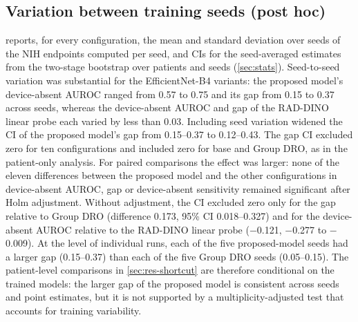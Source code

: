 \documentclass{ieeeaccess}
\begin{document}
\subsection{Variation between training seeds (post hoc)}
\label{sec:res-seeds}
 reports, for every configuration, the mean and standard deviation over seeds of the NIH endpoints computed per seed, and CIs for the seed-averaged estimates from the two-stage bootstrap over patients and seeds (\cref{sec:stats}). Seed-to-seed variation was substantial for the EfficientNet-B4 variants: the proposed model's device-absent AUROC ranged from 0.57 to 0.75 and its gap from 0.15 to 0.37 across seeds, whereas the device-absent AUROC and gap of the RAD-DINO linear probe each varied by less than 0.03. Including seed variation widened the CI of the proposed model's gap from 0.15--0.37 to 0.12--0.43. The gap CI excluded zero for ten configurations and included zero for base and Group DRO, as in the patient-only analysis. For paired comparisons the effect was larger: none of the eleven differences between the proposed model and the other configurations in device-absent AUROC, gap or device-absent sensitivity remained significant after Holm adjustment. Without adjustment, the CI excluded zero only for the gap relative to Group DRO (difference 0.173, 95\% CI 0.018--0.327) and for the device-absent AUROC relative to the RAD-DINO linear probe ($-$0.121, $-$0.277 to $-$0.009). At the level of individual runs, each of the five proposed-model seeds had a larger gap (0.15--0.37) than each of the five Group DRO seeds (0.05--0.15). The patient-level comparisons in \cref{sec:res-shortcut} are therefore conditional on the trained models: the larger gap of the proposed model is consistent across seeds and point estimates, but it is not supported by a multiplicity-adjusted test that accounts for training variability.
\end{document}
